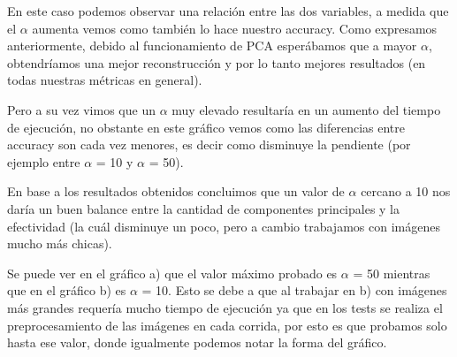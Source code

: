 En este caso podemos observar una relación entre las dos variables, a medida que el $\alpha$ aumenta vemos como también lo hace nuestro accuracy.
Como expresamos anteriormente, debido al funcionamiento de PCA esperábamos que a mayor $\alpha$, obtendríamos una mejor reconstrucción y por lo tanto mejores resultados (en todas nuestras métricas en general).

Pero a su vez vimos que un $\alpha$ muy elevado resultaría en un aumento del tiempo de ejecución, no obstante en este gráfico vemos como las diferencias entre accuracy son cada vez menores, es decir como disminuye la pendiente (por ejemplo entre $\alpha$ = 10 y $\alpha$ = 50).

En base a los resultados obtenidos concluimos que un valor de $\alpha$ cercano a 10 nos daría un buen balance entre la cantidad de componentes principales y la efectividad (la cuál disminuye un poco, pero a cambio trabajamos con imágenes mucho más chicas).

Se puede ver en el gráfico a) que el valor máximo probado es $\alpha$ = 50 mientras que en el gráfico b) es $\alpha$ = 10. Esto se debe a que al trabajar en b) con imágenes más grandes requería mucho tiempo de ejecución ya que en los tests se realiza el preprocesamiento de las imágenes en cada corrida, por esto es que probamos solo hasta ese valor, donde igualmente podemos notar la forma del gráfico.

